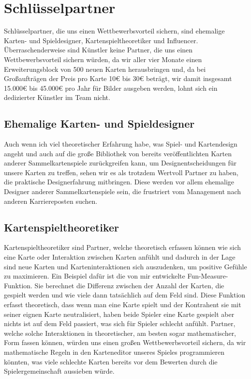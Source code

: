 \documentclass[fontsize=11, a4aper]{scrartcl}
\begin{document}

\section{Schlüsselpartner} \label{sec:Schlüsselpartner}

Schlüsselpartner, die uns einen Wettbewerbsvorteil sichern, sind ehemalige Karten- und Spieldesigner, Kartenspieltheoretiker und Influencer. Überraschenderweise sind Künstler keine Partner, die uns einen Wettbewerbsvorteil sichern würden, da wir aller vier Monate einen Erweiterungsblock von 500 neuen Karten herausbringen und, da bei Großaufträgen der Preis pro Karte 10€ bis 30€ beträgt, wir damit insgesamt 15.000€ bis 45.000€ pro Jahr für Bilder ausgeben werden, lohnt sich ein dedizierter Künstler im Team nicht.

\subsection{Ehemalige Karten- und Spieldesigner} \label{subsec:Ehemalige_Karten-_und_Spieldesigner}

Auch wenn ich viel theoretischer Erfahrung habe, was Spiel- und Kartendesign angeht und auch auf die große Bibliothek von bereits veröffentlichten Karten anderer Sammelkartenspiele zurückgreifen kann, um Designentscheidungen für unsere Karten zu treffen, sehen wir es als trotzdem Wertvoll Partner zu haben, die praktische Designerfahrung mitbringen. Diese werden vor allem ehemalige Designer anderer Sammelkartenspiele sein, die frustriert vom Management nach anderen Karriereposten suchen.

\subsection{Kartenspieltheoretiker} \label{subsec:Kartenspieltheoretiker}

Kartenspieltheoretiker sind Partner, welche theoretisch erfassen können wie sich eine Karte oder Interaktion zwischen Karten anfühlt und dadurch in der Lage sind neue Karten und Karteninteraktionen sich auszudenken, um positive Gefühle zu maximieren. Ein Beispiel dafür ist die von mir entwickelte \glqq Fun-Measure-Funktion\grqq{}. Sie berechnet die Differenz zwischen der Anzahl der Karten, die gespielt werden und wie viele dann tatsächlich auf dem Feld sind. Diese Funktion erfasst theoretisch, dass wenn man eine Karte spielt und der Kontrahent sie mit seiner eignen Karte neutralisiert, haben beide Spieler eine Karte gespielt aber nichts ist auf dem Feld passiert, was sich für Spieler schlecht anfühlt. Partner, welche solche Interaktionen in theoretischer, am besten sogar mathematischer, Form fassen können, würden uns einen großen Wettbewerbsvorteil sichern, da wir mathematische Regeln in den Karteneditor unseres Spieles programmieren könnten, was viele schlechte Karten bereits vor dem Bewerten durch die Spielergemeinschaft aussieben würde.
\end{document}
